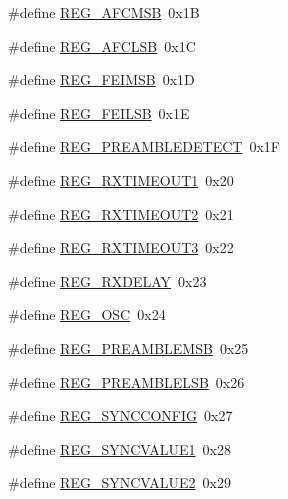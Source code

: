 \begin{DoxyCompactItemize}
\item 
\#define \mbox{\hyperlink{sx1276_regs-_fsk_8h_a989d0164e5d5090b39e25506526e0aa5}{R\+E\+G\+\_\+\+A\+F\+C\+M\+SB}}~0x1B
\item 
\#define \mbox{\hyperlink{sx1276_regs-_fsk_8h_a4c64591ff1cb9d48f90c679a6f5985c7}{R\+E\+G\+\_\+\+A\+F\+C\+L\+SB}}~0x1C
\item 
\#define \mbox{\hyperlink{sx1276_regs-_fsk_8h_a99f252ad098770ae36c2947075ba011a}{R\+E\+G\+\_\+\+F\+E\+I\+M\+SB}}~0x1D
\item 
\#define \mbox{\hyperlink{sx1276_regs-_fsk_8h_a02e249f7bd9ca6c91dea006e205bbbe5}{R\+E\+G\+\_\+\+F\+E\+I\+L\+SB}}~0x1E
\item 
\#define \mbox{\hyperlink{sx1276_regs-_fsk_8h_a8acf717d67c4e7f4b92a25653ddb495c}{R\+E\+G\+\_\+\+P\+R\+E\+A\+M\+B\+L\+E\+D\+E\+T\+E\+CT}}~0x1F
\item 
\#define \mbox{\hyperlink{sx1276_regs-_fsk_8h_afa819749e90d0ecb13a5d75f28af5ccb}{R\+E\+G\+\_\+\+R\+X\+T\+I\+M\+E\+O\+U\+T1}}~0x20
\item 
\#define \mbox{\hyperlink{sx1276_regs-_fsk_8h_aa5870403dc3e6ba5cb5212423051e18a}{R\+E\+G\+\_\+\+R\+X\+T\+I\+M\+E\+O\+U\+T2}}~0x21
\item 
\#define \mbox{\hyperlink{sx1276_regs-_fsk_8h_a8167beac9018acd4f54b530176170145}{R\+E\+G\+\_\+\+R\+X\+T\+I\+M\+E\+O\+U\+T3}}~0x22
\item 
\#define \mbox{\hyperlink{sx1276_regs-_fsk_8h_a8ee126fae09fa47e0ef722dc43a4dc22}{R\+E\+G\+\_\+\+R\+X\+D\+E\+L\+AY}}~0x23
\item 
\#define \mbox{\hyperlink{sx1276_regs-_fsk_8h_a1edb093ed684495473ecd2e97e3a49c2}{R\+E\+G\+\_\+\+O\+SC}}~0x24
\item 
\#define \mbox{\hyperlink{sx1276_regs-_fsk_8h_ab8a433a9dd9c4cebe485d1a1b49cfd4b}{R\+E\+G\+\_\+\+P\+R\+E\+A\+M\+B\+L\+E\+M\+SB}}~0x25
\item 
\#define \mbox{\hyperlink{sx1276_regs-_fsk_8h_a342040215f26acdefd5c95ec7c8ce828}{R\+E\+G\+\_\+\+P\+R\+E\+A\+M\+B\+L\+E\+L\+SB}}~0x26
\item 
\#define \mbox{\hyperlink{sx1276_regs-_fsk_8h_ae80bd3142a5c405bf7063ac7b0e8e101}{R\+E\+G\+\_\+\+S\+Y\+N\+C\+C\+O\+N\+F\+IG}}~0x27
\item 
\#define \mbox{\hyperlink{sx1276_regs-_fsk_8h_a4d0160e654656b6cd6426c295c8e131b}{R\+E\+G\+\_\+\+S\+Y\+N\+C\+V\+A\+L\+U\+E1}}~0x28
\item 
\#define \mbox{\hyperlink{sx1276_regs-_fsk_8h_a840d780f6d455dc828e2ec8217e9043a}{R\+E\+G\+\_\+\+S\+Y\+N\+C\+V\+A\+L\+U\+E2}}~0x29
\item 

\end{DoxyCompactItemize}
